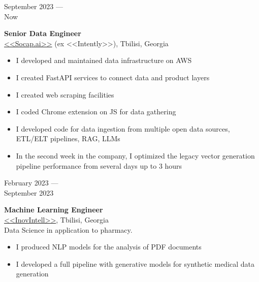 \documentclass[10pt,a4paper]{article}
\newcommand{\lmpratio}{0.15}
\newcommand{\rmpratio}{0.74}
\newcommand{\vSpace}{0.5cm}
\newcommand{\horizontalSpace}{0.05\textwidth}
\newcommand{\sectionMain}[1]{\textbf{#1}}
\begin{document}
	\begin{minipage}[t]{\lmpratio\textwidth}
		September 2023 --- \\Now
	\end{minipage}
	\hspace{\horizontalSpace}
	\begin{minipage}[t]{\rmpratio\textwidth}
		\sectionMain{Senior Data Engineer}\\
		\href{https://www.ycombinator.com/companies/socap-ai}{<<Socap.ai>>} (ex <<Intently>>), Tbilisi, Georgia\\[0.1cm]	

  
\begin{itemize}
    \item I developed and maintained data infrastructure on AWS
    \item I created FastAPI services to connect data and product layers
    \item I created web scraping facilities
    \item I coded Chrome extension on JS for data gathering
    \item  I developed code for data ingestion from multiple open data sources, ETL/ELT pipelines, RAG, LLMs
    \item  In the second week in the company, I optimized the legacy vector generation pipeline performance from several days up to 3 hours
    
\end{itemize}

        


	\end{minipage}	
	\vspace{\vSpace}

	\begin{minipage}[t]{\lmpratio\textwidth}
		February 2023 --- \\September 2023
	\end{minipage}
	\hspace{\horizontalSpace}
	\begin{minipage}[t]{\rmpratio\textwidth}
		\sectionMain{Machine Learning Engineer}\\
		\href{https://www.inovintell.com/}{<<InovIntell>>}, Tbilisi, Georgia\\[0.1cm]	

Data Science in application to pharmacy. 

\begin{itemize}
    \item I produced NLP models for the analysis of PDF documents
    \item I developed a full pipeline with generative models for synthetic medical data generation
\end{itemize}


	\end{minipage}	
	\vspace{\vSpace}
\end{document}
